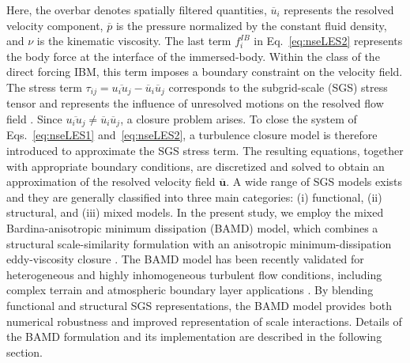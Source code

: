 \documentclass[%
superscriptaddress,
 amsmath,amssymb,
pra,
showkeys,
]{revtex4-2}
\begin{document}
Here, the overbar denotes spatially filtered quantities, $\overline{u}_i$ represents the resolved velocity component, $\overline{p}$ is the pressure normalized by the constant fluid density, and $\nu$ is the kinematic viscosity. The last term $f^{IB}_i$ in Eq.~\eqref{eq:nseLES2} represents the body force at the interface of the immersed-body. Within the class of the direct forcing IBM, this term imposes a boundary constraint on the velocity field. The stress term $\tau_{ij}=\overline{u_i u_j}-\overline{u}_i\overline{u}_j$ corresponds to the subgrid-scale (SGS) stress tensor and represents the influence of unresolved motions on the resolved flow field \cite{ferziger1977large,lesieur1996new,mason1994large,rogallo1984numerical}. Since $\overline{u_i u_j}\neq\overline{u}_i\overline{u}_j$, a closure problem arises. To close the system of Eqs.~\ref{eq:nseLES1} and~\ref{eq:nseLES2}, a turbulence closure model is therefore introduced to approximate the SGS stress term. The resulting equations, together with appropriate boundary conditions, are discretized and solved to obtain an approximation of the resolved velocity field $\overline{\bm{u}}$. A wide range of SGS models exists and they are generally classified into three main categories: (i) functional, (ii) structural, and (iii) mixed models. In the present study, we employ the mixed Bardina-anisotropic minimum dissipation (BAMD) model, which combines a structural scale-similarity formulation \cite{bardina1983improved} with an anisotropic minimum-dissipation eddy-viscosity closure \cite{rozema2015minimum,verstappen2018much,vreugdenhil2018large}. The BAMD model has been recently validated for heterogeneous and highly inhomogeneous turbulent flow conditions, including complex terrain and atmospheric boundary layer applications \cite{ajay2025mixed}. By blending functional and structural SGS representations, the BAMD model provides both numerical robustness and improved representation of scale interactions. Details of the BAMD formulation and its implementation are described in the following section.
\end{document}
